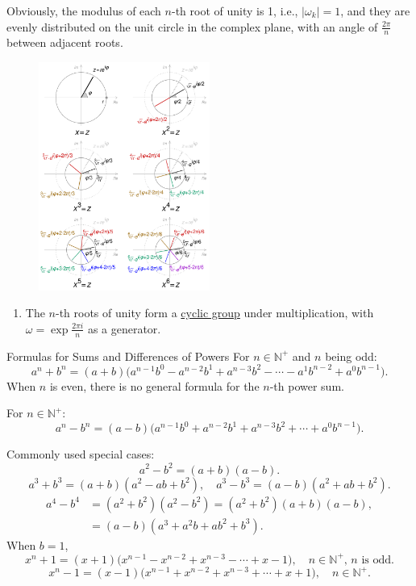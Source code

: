 \documentclass[11pt]{elegantbook}
\begin{document}
Obviously, the modulus of each \( n \)-th root of unity is 1, i.e., \( |\omega_k| = 1 \),
and they are evenly distributed on the unit circle in the complex plane,
with an angle of \( \frac{2\pi}{n} \) between adjacent roots.

\begin{figure}[h]
    \centering
    \includegraphics[width=0.5\textwidth]{img/Visualisation_complex_number_roots.png}
\end{figure}

\begin{property}
    \begin{enumerate}
        \item The \( n \)-th roots of unity form a \underline{cyclic group} under multiplication, 
            with \( \omega = \exp{\frac{2\pi i}{n}} \) as a generator.
    \end{enumerate}
\end{property}

\begin{proposition}{Formulas for Sums and Differences of Powers}
    For \(n \in \mathbb{N^+}\) and \(n\) being odd:
    \[
    a^n + b^n = (a+b)\big(a^{n-1}b^0 - a^{n-2}b^1 + a^{n-3}b^2 - \cdots - a^1b^{n-2} + a^0b^{n-1}\big).
    \]
    When \(n\) is even, there is no general formula for the \(n\)-th power sum.

    For \(n \in \mathbb{N^+}\):
    \[
    a^n - b^n = (a-b)\big(a^{n-1}b^0 + a^{n-2}b^1 + a^{n-3}b^2 + \cdots + a^0b^{n-1}\big).
    \]

    Commonly used special cases:
    \[
    a^2 - b^2 = (a+b)(a-b).
    \]
    \[
    a^3 + b^3 = (a+b)(a^2 - ab + b^2), \quad a^3 - b^3 = (a-b)(a^2 + ab + b^2).
    \]
    \[
    \begin{aligned}
    a^4 - b^4 &= (a^2 + b^2)(a^2 - b^2) = (a^2 + b^2)(a+b)(a-b), \\
    &= (a-b)(a^3 + a^2b + ab^2 + b^3).
    \end{aligned}
    \]
    When \(b=1\),
    \[
    x^n + 1 = (x+1)\big(x^{n-1} - x^{n-2} + x^{n-3} - \cdots + x - 1\big), \quad n \in \mathbb{N^+}, \, n \text{ is odd}.
    \]
    \[
    x^n - 1 = (x-1)\big(x^{n-1} + x^{n-2} + x^{n-3} + \cdots + x + 1\big), \quad n \in \mathbb{N^+}.
    \]
\end{proposition}
\end{document}
